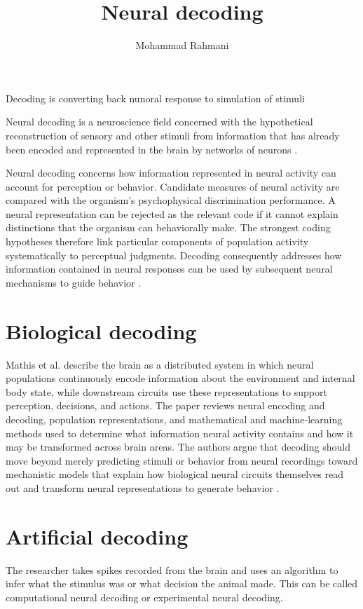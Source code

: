 \documentclass[a4paper]{article}
\title{Neural decoding}
\date{}
\author{Mohammad Rahmani}
\begin{document}
    \maketitle
    Decoding is converting back nunoral response to simulation of stimuli
    
    Neural decoding is a neuroscience field concerned with the hypothetical reconstruction of sensory and other stimuli from information that has already been encoded and represented in the brain by networks of neurons .
    
    Neural decoding concerns how information represented in neural activity can account for perception or behavior. Candidate measures of neural activity are compared with the organism's psychophysical discrimination performance. A neural representation can be rejected as the relevant code if it cannot explain distinctions that the organism can behaviorally make. The strongest coding hypotheses therefore link particular components of population activity systematically to perceptual judgments. Decoding consequently addresses how information contained in neural responses can be used by subsequent neural mechanisms to guide behavior \cite{johnson-2000-neural-coding}.
    
    
    \section{Biological decoding}
        Mathis et al. describe the brain as a distributed system in which neural populations continuously encode information about the environment and internal body state, while downstream circuits use these representations to support perception, decisions, and actions. The paper reviews neural encoding and decoding, population representations, and mathematical and machine-learning methods used to determine what information neural activity contains and how it may be transformed across brain areas. The authors argue that decoding should move beyond merely predicting stimuli or behavior from neural recordings toward mechanistic models that explain how biological neural circuits themselves read out and transform neural representations to generate behavior \cite{mathis-2024-decoding-the-brain-from-neural-representations-to-mechanistic-models}.
    
    
    \section{Artificial decoding}
        The researcher takes spikes recorded from the brain and uses an algorithm to infer what the stimulus was or what decision the animal made. This can be called computational neural decoding or experimental neural decoding.
        
\end{document}
